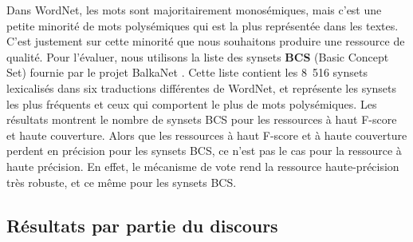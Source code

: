 Dans WordNet, les mots sont majoritairement monosémiques, mais c'est une petite minorité de mots polysémiques qui est la plus représentée dans les textes. C'est justement sur cette minorité que nous souhaitons produire une ressource de qualité. Pour l'évaluer, nous utilisons la liste des synsets \textbf{BCS} (Basic Concept Set) fournie par le projet BalkaNet \citep{tufis2004balkanet}. Cette liste contient les 8~516 synsets lexicalisés dans six traductions différentes de WordNet, et représente les synsets les plus fréquents et ceux qui comportent le plus de mots polysémiques. Les résultats montrent le nombre de synsets BCS pour les ressources à haut F-score et haute couverture. Alors que les ressources à haut F-score et à haute couverture perdent en précision pour les synsets BCS, ce n'est pas le cas pour la ressource à haute précision. En effet, le mécanisme de vote rend la ressource haute-précision très robuste, et ce même pour les synsets BCS.



\subsection{Résultats par partie du discours}
\label{subsec:selectors}


